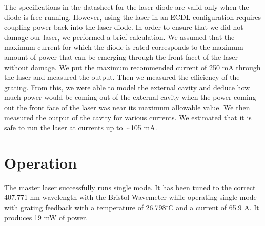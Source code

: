 The specifications in the datasheet for the laser diode are valid only when the diode is free running. However, using the laser in an ECDL configuration requires coupling power back into the laser diode. In order to ensure that we did not damage our laser, we performed a brief calculation. We assumed that the maximum current for which the diode is rated corresponds to the maximum amount of power that can be emerging through the front facet of the laser without damage. We put the maximum recommended current of 250 mA through the laser and measured the output. Then we measured the efficiency of the grating. From this, we were able to model the external cavity and deduce how much power would be coming out of the external cavity when the power coming out the front face of the laser was near its maximum allowable value. We then measured the output of the cavity for various currents. We estimated that it is safe to run the laser at currents up to $\sim$105 mA. 

 
\section{Operation}

The master laser successfully runs single mode. It has been tuned to the correct 407.771 nm wavelength with the Bristol Wavemeter while operating single mode with grating feedback with a temperature of 26.798$^\circ$C and a current of 65.9 A. It produces 19 mW of power. 




